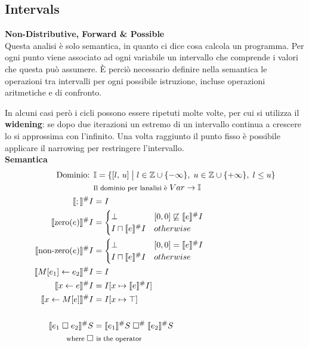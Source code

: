 \documentclass[a4paper,12pt,openany]{article}
\begin{document}
\clearpage
\subsection{Intervals}
\textbf{Non-Distributive, Forward \& Possible}\\[1em]
Questa analisi è solo semantica, in quanto ci dice cosa calcola un programma. Per ogni punto viene associato ad ogni variabile un intervallo che comprende i valori che questa può assumere. È perciò necessario definire nella semantica le operazioni tra intervalli per ogni possibile istruzione, incluse operazioni aritmetiche e di confronto.

In alcuni casi però i cicli possono essere ripetuti molte volte, per cui si utilizza il \textbf{widening}: se dopo due iterazioni un estremo di un intervallo continua a crescere lo si approssima con l'infinito. Una volta raggiunto il punto fisso è possibile applicare il narrowing per restringere l'intervallo.\\[1em]

\textbf{Semantica}
\begin{align*}
\mbox{Dominio: }& \mathbb{I}=\{[l,\,u]\;\big\vert\; l\in\mathbb{Z}\cup\{-\infty\},\; u\in\mathbb{Z}\cup\{+\infty\},\; l\leq u\}\\
&\mbox{\footnotesize Il dominio per lanalisi è} \; Var \rightarrow \mathbb{I}\\
\llbracket ; \rrbracket^\#I &= I\\
\llbracket \mbox{zero}(e) \rrbracket^\#I &= 
\begin{cases}
    \bot & [0, 0] \not\sqsubseteq \llbracket e \rrbracket^\#I\\
    I\sqcap\llbracket e \rrbracket^\#I & otherwise
\end{cases}\\
\llbracket \mbox{non-zero}(e) \rrbracket^\#I &= 
\begin{cases}
    \bot & [0, 0] = \llbracket e \rrbracket^\#I\\
    I\sqcap\llbracket e \rrbracket^\#I & otherwise
\end{cases}\\
\llbracket M[e_1]\leftarrow e_2 \rrbracket^\#I &= I\\
\llbracket x \leftarrow e \rrbracket^\#I &= I[x\mapsto\llbracket e \rrbracket^\#I]\\
\llbracket x \leftarrow M[e] \rrbracket^\#I &= I[x\mapsto\top]
\\\\
\llbracket e_1 \;\square\; e_2 \rrbracket^\#S &= \llbracket e_1  \rrbracket^\#S \;\square^\#\; \llbracket e_2 \rrbracket^\#S\\
\mbox{\footnotesize where } \square & \mbox{ \footnotesize is the operator}
\end{align*}
\end{document}
